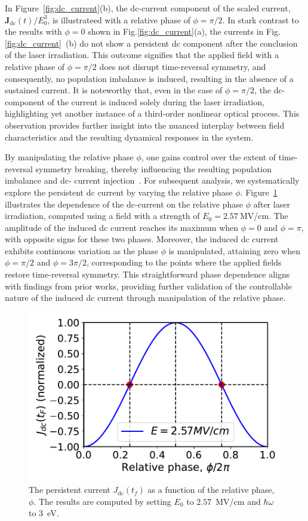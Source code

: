In Figure~\ref{fig:dc_current}(b), the dc-current component of the scaled current, $\mathbf{J}_{\text{dc}}(t)/E_0^3$, is illustrateed with a relative phase of $\phi=\pi/2$. In stark contrast to the results with $\phi=0$ shown in Fig.\ref{fig:dc_current}(a), the currents in Fig.\ref{fig:dc_current}~(b) do not show a persistent dc component after the conclusion of the laser irradiation. This outcome signifies that the applied field with a relative phase of $\phi=\pi/2$ does not disrupt time-reversal symmetry, and consequently, no population imbalance is induced, resulting in the absence of a sustained current. It is noteworthy that, even in the case of $\phi=\pi/2$, the dc-component of the current is induced solely during the laser irradiation, highlighting yet another instance of a third-order nonlinear optical process. This observation provides further insight into the nuanced interplay between field characteristics and the resulting dynamical responses in the system.


By manipulating the relative phase $\phi$, one gains control over the extent of time-reversal symmetry breaking, thereby influencing the resulting population imbalance and dc- current injection~\cite{PhysRevLett.74.3596}. For subsequent analysis, we systematically explore the persistent dc current by varying the relative phase $\phi$. Figure~\ref{fig: imbalance} illustrates the dependence of the dc-current on the relative phase $\phi$ after laser irradiation, computed using a field with a strength of $E_0=2.57~$MV/cm. The amplitude of the induced dc current reaches its maximum when $\phi=0$ and $\phi=\pi$, with opposite signs for these two phases. Moreover, the induced dc current exhibits continuous variation as the phase $\phi$ is manipulated, attaining zero when $\phi=\pi/2$ and $\phi=3\pi/2$, corresponding to the points where the applied fields restore time-reversal symmetry. This straightforward phase dependence aligns with findings from prior works\cite{PhysRevLett.74.3596,PhysRevLett.78.306}, providing further validation of the controllable nature of the induced dc current through manipulation of the relative phase.

\begin{figure}[htbp]
\centering
\includegraphics[width=0.8\linewidth]{pic/relativephase.pdf}
\caption{\label{fig: imbalance} 
The persistent current $J_{\text{dc}}(t_f)$ as a function of the relative phase, $\phi$. The results are computed by setting $E_0$ to $2.57$~MV/cm and $\hbar \omega$ to 3~eV.}
\end{figure}


